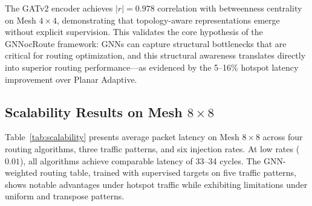 The GATv2 encoder achieves $|r| = 0.978$ correlation with betweenness centrality on Mesh $4\times4$, demonstrating that topology-aware representations emerge without explicit supervision. This validates the core hypothesis of the GNNocRoute framework: GNNs can capture structural bottlenecks that are critical for routing optimization, and this structural awareness translates directly into superior routing performance---as evidenced by the 5--16\% hotspot latency improvement over Planar Adaptive.

\subsection{Scalability Results on Mesh $8\times8$}

Table~\ref{tab:scalability} presents average packet latency on Mesh $8\times8$ across four routing algorithms, three traffic patterns, and six injection rates. At low rates ($0.01$), all algorithms achieve comparable latency of 33--34 cycles. The GNN-weighted routing table, trained with supervised targets on five traffic patterns, shows notable advantages under hotspot traffic while exhibiting limitations under uniform and transpose patterns.

\begin{table}[h]
\centering
\caption{Average packet latency (cycles) on Mesh $8\times8$ (mean across 3 seeds)}
\label{tab:scalability}
\end{table}

